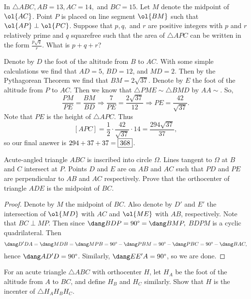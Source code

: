 \documentclass[letterpaper,oneside]{scrartcl}
\begin{document}
\begin{problem*}
  In \(\triangle ABC, AB = 13, AC = 14,\) and \(BC = 15\). Let \(M\) denote the midpoint of \(\ol{AC}\). Point \(P\) is placed on line segment \(\ol{BM}\) such that \(\ol{AP} \perp \ol{PC}\). Suppose that \(p, q,\) and \(r\) are positive integers with \(p\) and \(r\) relatively prime and \(q\) squarefree such that the area of \(\triangle APC\) can be written in the form \(\frac{p\sqrt{q}}{r}.\) What is \(p + q + r\)?
\end{problem*}
\begin{soln}
  Denote by \(D\) the foot of the altitude from \(B\) to \(AC\). With some simple calculations we find that \(AD = 5\), \(BD = 12\), and \(MD = 2\). Then by the Pythagorean Theorem we find that \(BM = 2\sqrt{37}\). Denote by \(E\) the foot of the altitude from \(P\) to \(AC\). Then we know that \(\triangle PME \sim \triangle BMD\) by \(AA\sim\). So,
  \[\frac{PM}{PE}=\frac{BM}{BD}\Longrightarrow\frac{7}{PE}=\frac{2\sqrt{37}}{12}\Longrightarrow PE = \frac{42}{\sqrt{37}}.\]
  Note that \(PE\) is the height of \(\triangle APC\). Thus
  \[[APC]= \frac12\cdot\frac{42}{\sqrt{37}}\cdot14= \frac{294\sqrt{37}}{37},\]
  so our final answer is \(294+37+37=\fbox{368}\).
\end{soln}
\begin{problem*}
  Acute-angled triangle \(ABC\) is inscribed into circle \(\Omega\). Lines tangent to \(\Omega\) at \(B\) and \(C\) intersect at \(P\). Points \(D\) and \(E\) are on \(AB\) and \(AC\) such that \(PD\) and \(PE\) are perpendicular to \(AB\) and \(AC\) respectively. Prove that the orthocenter of triangle \(ADE\) is the midpoint of \(BC\).
\end{problem*}
\begin{proof}
  Denote by \(M\) the midpoint of \(BC\). Also denote by \(D'\) and \(E'\) the intersection of \(\ol{MD}\) with \(AC\) and \(\ol{ME}\) with \(AB\), respectively. Note that \(BC \perp MP\). Then since \(\dang BDP = 90\degree = \dang BMP,\) \(BDPM\) is a cyclic quadrilateral. Then
  \[\dang D'DA = \dang MDB = \dang MPB = 90\degree - \dang PBM = 90\degree - \dang PBC = 90\degree - \dang BAC,\]
  hence \(\dang AD'D = 90\degree\). Similarly, \(\dang EE'A = 90\degree\), so we are done.
\end{proof}
\begin{problem*}
  For an acute triangle \(\triangle ABC\) with orthocenter \(H\), let \(H_A\) be the foot of the altitude from \(A\) to \(BC\), and define \(H_B\) and \(H_C\) similarly. Show that \(H\) is the incenter of \(\triangle H_AH_BH_C\).
\end{problem*}
\end{document}
